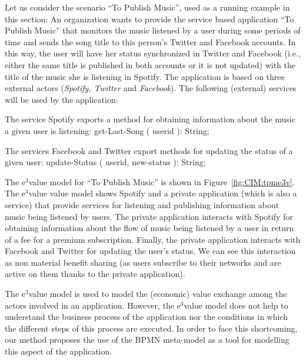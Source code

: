 \documentclass{singlecol-new}
\theoremstyle{TH}{
\newtheorem{lemma}{Lemma}
\newtheorem{theorem}[lemma]{Theorem}
\newtheorem{corrolary}[lemma]{Corrolary}
\newtheorem{conjecture}[lemma]{Conjecture}
\newtheorem{proposition}[lemma]{Proposition}
\newtheorem{claim}[lemma]{Claim}
\newtheorem{stheorem}[lemma]{Wrong Theorem}
\newtheorem{algorithm}{Algorithm}
}
\theoremstyle{THrm}{
\newtheorem{definition}{Definition}[section]
\newtheorem{question}{Question}[section]
\newtheorem{remark}{Remark}
\newtheorem{scheme}{Scheme}
}
\theoremstyle{THhit}{
\newtheorem{case}{Case}[section]
}
\theoremstyle{THhsl}{
\newtheorem{example}{Example}
}
\begin{document}
\begin{example}\label{ex:toPublicMusic}
Let us consider the scenario ``To Publish Music'', used as a running example in this section:
An organization wants to provide the service based application ``To Publish Music'' that monitors the music listened by a user during some periods of time and sends the song title  to this person's Twitter and Facebook accounts.
In this way, the user will have her status synchronized in  Twitter and Facebook (i.e., either the same title is published in both accounts or it is not updated) with the title of the music she is listening in Spotify.
The application is based on three external actors ({\em Spotify, Twitter} and {\em Facebook}).
The following (external) services will be used by the application:

\begin{compactitem}
\item The  service   Spotify exports a meth\-od for obtaining information  about the music a given user is listening:
 {\sf\small get-Last-Song ( userid ): String}; 
\item The services Facebook and Twitter export meth\-ods for  updating the status of a given user:
 {\sf\small update-Status ( userid, new-status ): String};
\end{compactitem}




The e$^3$value model for ``To Publish Music'' is shown in Figure~\ref{fig:CIM:tpme3v}.
The e$^3$value value model shows Spotify and a private application (which is also a service) that provide services for listening and publishing information about music being listened by users. 
The private application interacts with Spotify for obtaining information about the flow of music being listened by a user in return of a fee for a premium subscription. 
Finally, the private application interacts with Facebook and Twitter for updating the user's status.
We can see this interaction as non material benefit sharing (as users subscribe to their networks and are active on them thanks to the private application).
\end{example}

The e$^3$value  model is used to model the (economic) value exchange among the actors involved in an application.
However, the e$^3$val\-ue model does not help to understand the business process of the application nor the conditions in which the different steps of this process are executed.
In order to face this shortcoming, our method proposes the use of the BPMN meta-model as a tool for modelling this aspect of the application.
\end{document}
